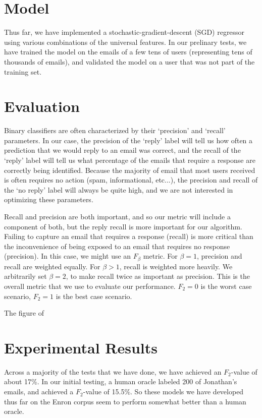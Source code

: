 \documentclass[10pt]{article}
\begin{document}
\section*{Model}

Thus far, we have implemented a stochastic-gradient-descent (SGD) regressor using various combinations of the universal features. In our prelinary tests, we have trained the model on the emails of a few tens of users (representing tens of thousands of emails), and validated the model on a user that was not part of the training set. 

\section*{Evaluation}

Binary classifiers are often characterized by their `precision' and `recall' parameters. In our case, the precision of the `reply' label will tell us how often a prediction that we would reply to an email was correct, and the recall of the `reply' label will tell us what percentage of the emails that require a response are correctly being identified. Because the majority of email that most users received is often requires no action (spam, informational, etc...), the precision and recall of the `no reply' label will always be quite high, and we are not interested in optimizing these parameters.

Recall and precision are both important, and so our metric will include a component of both, but the reply recall is more important for our algorithm. Failing to capture an email that requires a response (recall) is more critical than the inconvenience of being exposed to an email that requires no response (precision). In this case, we might use an $F_\beta$ metric\cite{fbetawikipedia}. For $\beta = 1$, precision and recall are weighted equally. For $\beta > 1$, recall is weighted more heavily. We arbitrarily set $\beta = 2$, to make recall twice as important as precision. This is the overall metric that we use to evaluate our performance. $F_2 = 0$ is the worst case scenario, $F_2 = 1$ is the best case scenario.

The figure of 

\section*{Experimental Results}

Across a majority of the tests that we have done, we have achieved an $F_2$-value of about 17\%. In our initial testing, a human oracle labeled 200 of Jonathan's emails, and achieved a $F_2$-value of 15.5\%. So these models we have developed thus far on the Enron corpus seem to perform somewhat better than a human oracle. 
\end{document}
